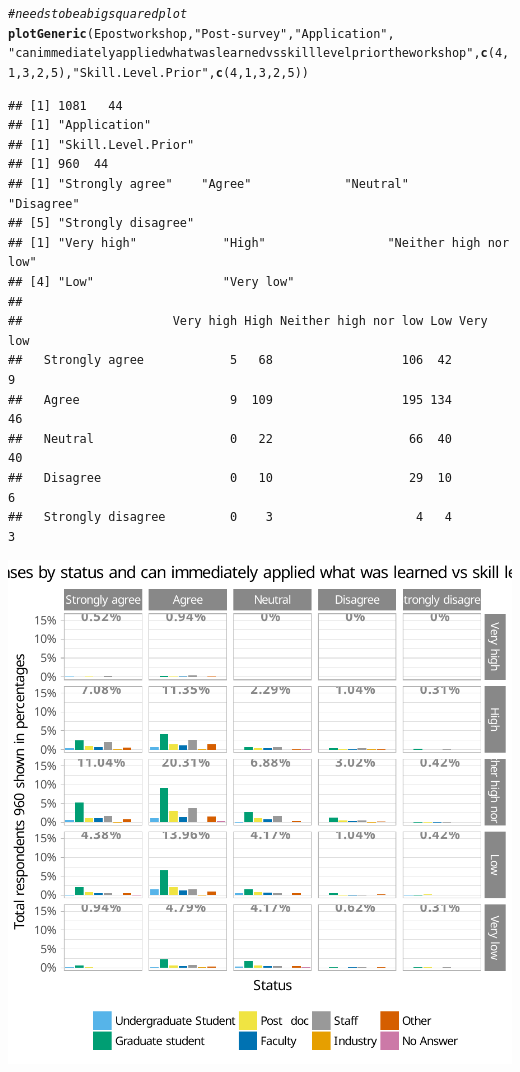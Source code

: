 \documentclass{article}\usepackage[]{graphicx}\usepackage[]{color}
\makeatletter
\newcommand{\hlnum}[1]{\textcolor[rgb]{0.686,0.059,0.569}{#1}}%
\newcommand{\hlstr}[1]{\textcolor[rgb]{0.192,0.494,0.8}{#1}}%
\newcommand{\hlcom}[1]{\textcolor[rgb]{0.678,0.584,0.686}{\textit{#1}}}%
\newcommand{\hlstd}[1]{\textcolor[rgb]{0.345,0.345,0.345}{#1}}%
\newcommand{\hlkwd}[1]{\textcolor[rgb]{0.737,0.353,0.396}{\textbf{#1}}}%
\newenvironment{kframe}{%
 \def\at@end@of@kframe{}%
 \ifinner\ifhmode%
  \def\at@end@of@kframe{\end{minipage}}%
  \begin{minipage}{\columnwidth}%
 \fi\fi%
 \def\FrameCommand##1{\hskip\@totalleftmargin \hskip-\fboxsep
 \colorbox{shadecolor}{##1}\hskip-\fboxsep
     \hskip-\linewidth \hskip-\@totalleftmargin \hskip\columnwidth}%
 \MakeFramed {\advance\hsize-\width
   \@totalleftmargin\z@ \linewidth\hsize
   \@setminipage}}%
 {\par\unskip\endMakeFramed%
 \at@end@of@kframe}
\newenvironment{knitrout}{}{} %
\makeatother
\begin{document}
\begin{knitrout}
\begin{kframe}\begin{alltt}
\hlcom{# needs to be a big squared plot}
\hlkwd{plotGeneric}\hlstd{(Epostworkshop,} \hlstr{"Post-survey"}\hlstd{,} \hlstr{"Application"} \hlstd{,}
            \hlstr{"can immediately applied what was learned vs skill level prior the workshop"}\hlstd{,}  \hlkwd{c}\hlstd{(}\hlnum{4}\hlstd{,}\hlnum{1}\hlstd{,}\hlnum{3}\hlstd{,}\hlnum{2}\hlstd{,}\hlnum{5}\hlstd{),}\hlstr{"Skill.Level.Prior"}\hlstd{,} \hlkwd{c}\hlstd{(}\hlnum{4}\hlstd{,}\hlnum{1}\hlstd{,}\hlnum{3}\hlstd{,}\hlnum{2}\hlstd{,}\hlnum{5}\hlstd{))}
\end{alltt}
\begin{verbatim}
## [1] 1081   44
## [1] "Application"
## [1] "Skill.Level.Prior"
## [1] 960  44
## [1] "Strongly agree"    "Agree"             "Neutral"           "Disagree"         
## [5] "Strongly disagree"
## [1] "Very high"            "High"                 "Neither high nor low"
## [4] "Low"                  "Very low"            
##                    
##                     Very high High Neither high nor low Low Very low
##   Strongly agree            5   68                  106  42        9
##   Agree                     9  109                  195 134       46
##   Neutral                   0   22                   66  40       40
##   Disagree                  0   10                   29  10        6
##   Strongly disagree         0    3                    4   4        3
\end{verbatim}
\end{kframe}

{\centering \includegraphics[width=.6\linewidth]{figure/calls-Rnwplotting-postsurvey-data-19} 

}



\end{knitrout}
\end{document}
